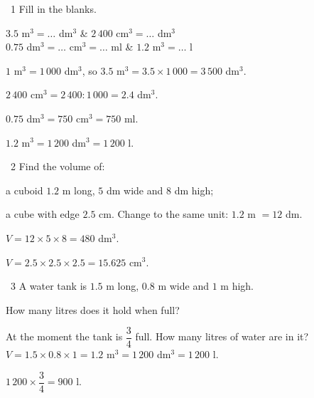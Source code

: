 \begin{exbox}{\ExWord\ 1}
Fill in the blanks.
\begin{cols2}
 $3.5$ m$^3=\ldots$ dm$^3$ &  $2\,400$ cm$^3=\ldots$ dm$^3$\\
 $0.75$ dm$^3=\ldots$ cm$^3=\ldots$ ml &  $1.2$ m$^3=\ldots$ l
\end{cols2}
\guide
{} $1$ m$^3=1\,000$ dm$^3$, so $3.5$ m$^3=3.5\times1\,000=3\,500$ dm$^3$.\par
{} $2\,400$ cm$^3=2\,400:1\,000=2.4$ dm$^3$.\par
{} $0.75$ dm$^3=750$ cm$^3=750$ ml.\par
{} $1.2$ m$^3=1\,200$ dm$^3=1\,200$ l.
\end{exbox}
\gap
\begin{exbox}{\ExWord\ 2}
Find the volume of:\par
{} a cuboid $1.2$ m long, $5$ dm wide and $8$ dm high;\par
{} a cube with edge $2.5$ cm.
\guide
{} Change to the same unit: $1.2$ m $=12$ dm.\par $V=12\times5\times8=480$ dm$^3$.\par
{} $V=2.5\times2.5\times2.5=15.625$ cm$^3$.
\end{exbox}
\gap
\begin{exbox}{\ExWord\ 3}
A water tank is $1.5$ m long, $0.8$ m wide and $1$ m high.\par
{} How many litres does it hold when full?\par
{} At the moment the tank is $\dfrac34$ full. How many litres of water are in it?
\guide
{} $V=1.5\times0.8\times1=1.2$ m$^3=1\,200$ dm$^3=1\,200$ l.\par
{} $1\,200\times\dfrac34=900$ l.
\end{exbox}
\gap

